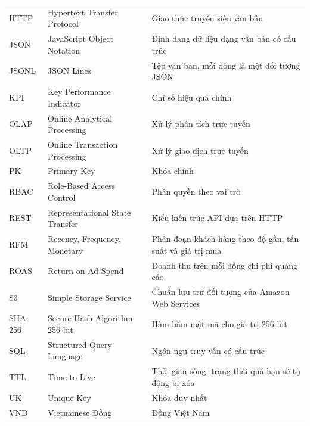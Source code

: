 \begin{longtable}{@{}>{\raggedright\arraybackslash}p{1.9cm} >{\raggedright\arraybackslash}p{5.4cm} >{\raggedright\arraybackslash}p{7.7cm}@{}}
HTTP & Hypertext Transfer Protocol & Giao thức truyền siêu văn bản \\
JSON & JavaScript Object Notation & Định dạng dữ liệu dạng văn bản có cấu trúc \\
JSONL & JSON Lines & Tệp văn bản, mỗi dòng là một đối tượng JSON \\
KPI & Key Performance Indicator & Chỉ số hiệu quả chính \\
OLAP & Online Analytical Processing & Xử lý phân tích trực tuyến \\
OLTP & Online Transaction Processing & Xử lý giao dịch trực tuyến \\
PK & Primary Key & Khóa chính \\
RBAC & Role-Based Access Control & Phân quyền theo vai trò \\
REST & Representational State Transfer & Kiểu kiến trúc API dựa trên HTTP \\
RFM & Recency, Frequency, Monetary & Phân đoạn khách hàng theo độ gần, tần suất và giá trị mua \\
ROAS & Return on Ad Spend & Doanh thu trên mỗi đồng chi phí quảng cáo \\
S3 & Simple Storage Service & Chuẩn lưu trữ đối tượng của Amazon Web Services \\
SHA-256 & Secure Hash Algorithm 256-bit & Hàm băm mật mã cho giá trị 256 bit \\
SQL & Structured Query Language & Ngôn ngữ truy vấn có cấu trúc \\
TTL & Time to Live & Thời gian sống: trạng thái quá hạn sẽ tự động bị xóa \\
UK & Unique Key & Khóa duy nhất \\
VND & Vietnamese Đồng & Đồng Việt Nam \\
\end{longtable}
\endgroup
